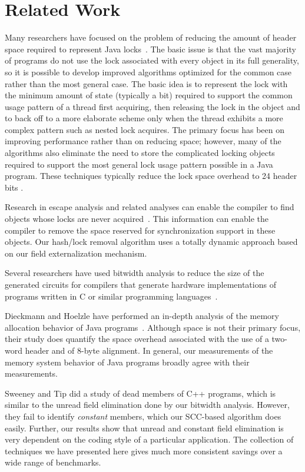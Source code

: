 \documentclass[oribibl]{llncs}
\begin{document}
\section{Related Work}
%
Many researchers have focused on the problem of reducing the amount of
header space required to represent Java
locks~\cite{BKMS98,OK99,ADGKRW99}. The basic issue is that the vast
majority of programs do not use the lock associated with every object
in its full generality, so it is possible to develop improved
algorithms optimized for the common case rather than the most general
case. The basic idea is to represent the lock with the minimum amount
of state (typically a bit) required to support the common usage
pattern of a thread first acquiring, then releasing the lock in the
object and to back off to a more elaborate scheme only when the thread
exhibits a more complex pattern such as nested lock acquires. The
primary focus has been on improving performance rather than on
reducing space; however, many of the algorithms also eliminate the
need to store the complicated locking objects required to support the
most general lock usage pattern possible in a Java program. These
techniques typically reduce the lock space overhead to 24 header bits
\cite{BKMS98}.

Research in escape analysis and related analyses can enable the
compiler to find objects whose locks are never 
acquired~\cite{ACSE99,BH99,WR99:OOPSLA99,CGSSM99,Ruf00:PLDI00,SR01:PPOPP01}.
This information can enable the compiler to remove the space
reserved for synchronization support in these objects. 
Our hash/lock removal algorithm uses a totally dynamic approach
based on our field externalization mechanism. 

Several researchers have used bitwidth analysis to reduce the size
of the generated circuits for compilers that generate hardware
implementations of programs written in C or similar programming 
languages~\cite{ananian:siliconc,RR00:PLDI00,SBA00:PLDI00,BGSW00}.

Dieckmann and Hoelzle have performed an in-depth analysis of the
memory allocation behavior of Java programs~\cite{DH99}. Although 
space is not their primary focus, their study does quantify 
the space overhead associated with the use of a two-word header
and of 8-byte alignment. In general, our measurements of the 
memory system behavior of Java programs broadly agree with their
measurements. 

Sweeney and Tip \cite{SweeneyTip98DeadDataMembers} did a study of dead
members of C++ programs, which is similar to the unread field
elimination done by our bitwidth analysis.  However, they
fail to identify {\it constant} members, which our SCC-based algorithm
does easily.  Further, our results show that unread and constant field
elimination is very dependent on the coding style of a particular
application.  The collection of techniques we have presented here
gives much more consistent savings over a wide range of benchmarks.
\end{document}
